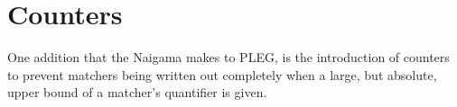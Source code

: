 \section{Counters}

One addition that the Naigama makes to PLEG, is the introduction
of counters to prevent matchers being written out completely
when a large, but absolute, upper bound of a matcher's quantifier
is given.

